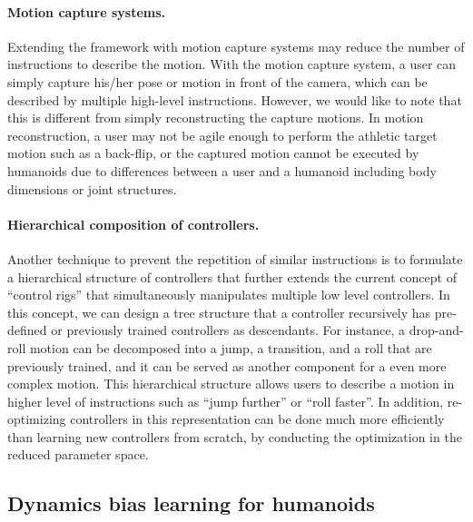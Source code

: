 \paragraph{Motion capture systems.}
Extending the framework with motion capture systems may reduce the number of
instructions to describe the motion.
With the motion capture system, a user can simply capture his/her pose or
motion in front of the camera, which can be described by multiple high-level
instructions. 
However, we would like to note that this is different from simply
reconstructing the capture motions.
In motion reconstruction, a user may not be agile enough to perform
the athletic target motion such as a back-flip,
or the captured motion cannot be executed by humanoids due to differences
between a user and a humanoid including body dimensions or joint structures.

\paragraph{Hierarchical composition of controllers.}
Another technique to prevent the repetition of similar instructions is to
formulate a hierarchical structure of controllers that further extends the
current concept of ``control rigs'' that simultaneously manipulates multiple
low level controllers.
In this concept, we can design a tree structure that a controller recursively
has pre-defined or previously trained controllers as descendants.
For instance, a drop-and-roll motion can be decomposed into a jump, a
transition, and a roll that are previously trained, and
it can be served as another component for a even more complex motion.
This hierarchical structure allows users to describe a motion in higher level
of instructions such as ``jump further'' or ``roll faster''.
In addition, re-optimizing controllers in this representation can be done much
more efficiently than learning new controllers from scratch, by conducting the
optimization in the reduced parameter space.

\subsection{Dynamics bias learning for humanoids} 

